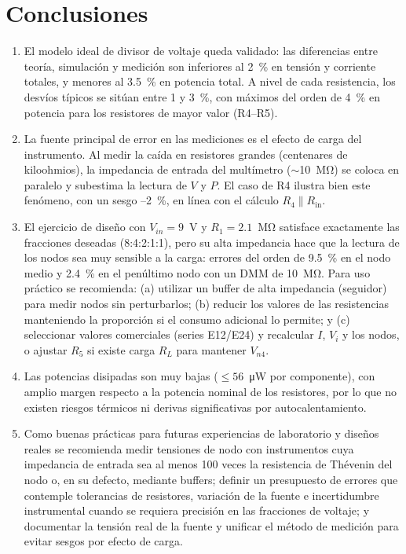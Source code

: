 \documentclass[conference]{IEEEtran}
\begin{document}
\section{Conclusiones}
\begin{enumerate}[label=\arabic*.]
  \item El modelo ideal de divisor de voltaje queda validado: las diferencias entre teoría, simulación y medición son inferiores al 2~\% en tensión y corriente totales, y menores al 3.5~\% en potencia total.  A nivel de cada resistencia, los desvíos típicos se sitúan entre 1 y 3~\%, con máximos del orden de 4~\% en potencia para los resistores de mayor valor (R4–R5).
  \item La fuente principal de error en las mediciones es el efecto de carga del instrumento.  Al medir la caída en resistores grandes (centenares de kiloohmios), la impedancia de entrada del multímetro (\mbox{$\sim$10~M\si{\ohm}}) se coloca en paralelo y subestima la lectura de $V$ y $P$.  El caso de R4 ilustra bien este fenómeno, con un sesgo \mbox{–2~\%}, en línea con el cálculo \mbox{$R_4\parallel R_{\mathrm{in}}$}\cite{ref:aac_voltmeter}.
  \item El ejercicio de diseño con \mbox{$V_{in}=9$~V} y \mbox{$R_1=2.1$~M\si{\ohm}} satisface exactamente las fracciones deseadas (8:4:2:1:1), pero su alta impedancia hace que la lectura de los nodos sea muy sensible a la carga: errores del orden de 9.5~\% en el nodo medio y 2.4~\% en el penúltimo nodo con un DMM de 10~M\si{\ohm}.  Para uso práctico se recomienda: (a) utilizar un buffer de alta impedancia (seguidor) para medir nodos sin perturbarlos; (b) reducir los valores de las resistencias manteniendo la proporción si el consumo adicional lo permite; y (c) seleccionar valores comerciales (series E12/E24) y recalcular $I$, $V_i$ y los nodos, o ajustar $R_5$ si existe carga $R_L$ para mantener $V_{n4}$\cite{ref:guia,ref:aac_voltmeter}.
  \item Las potencias disipadas son muy bajas (\mbox{$\leq56$~\si{\micro W}} por componente), con amplio margen respecto a la potencia nominal de los resistores, por lo que no existen riesgos térmicos ni derivas significativas por autocalentamiento.
  \item Como buenas prácticas para futuras experiencias de laboratorio y diseños reales se recomienda medir tensiones de nodo con instrumentos cuya impedancia de entrada sea al menos 100 veces la resistencia de Thévenin del nodo o, en su defecto, mediante buffers; definir un presupuesto de errores que contemple tolerancias de resistores, variación de la fuente e incertidumbre instrumental cuando se requiera precisión en las fracciones de voltaje; y documentar la tensión real de la fuente y unificar el método de medición para evitar sesgos por efecto de carga\cite{ref:aac_measurement}.
\end{enumerate}
\end{document}
